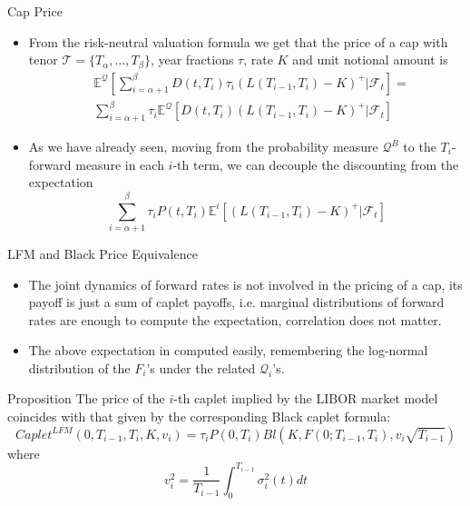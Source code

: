 \documentclass{beamer}
\begin{document}
\begin{frame}{Cap Price}
	\begin{itemize}
		\item From the risk-neutral valuation formula we get that the price of a cap with tenor $\mathcal{T} = \{T_\alpha,\ldots, T_\beta\}$, year fractions $\tau$, rate $K$ and unit notional amount is
		\begin{equation*}
			\begin{aligned}
			&\mathbb{E}^\mathcal{Q}\left[\sum_{i=\alpha+1}^{\beta}D(t,T_i)\tau_i(L(T_{i-1},T_i)-K)^+|\mathcal{F}_t\right]= \\
			&\sum_{i=\alpha+1}^{\beta}\tau_i\mathbb{E}^\mathcal{Q}[D(t,T_i)(L(T_{i-1},T_i)-K)^+|\mathcal{F}_t]
			\end{aligned}
		\end{equation*}
		\item As we have already seen, moving from the probability measure $\mathcal{Q}^B$ to the $T_i$-forward measure in each $i$-th term, we can decouple the discounting from the expectation
		\begin{equation*}
			\sum_{i=\alpha+1}^{\beta}\tau_iP(t,T_i)\mathbb{E}^i[(L(T_{i-1},T_i)-K)^+|\mathcal{F}_t]
		\end{equation*}
	\end{itemize}
\end{frame}

\begin{frame}{LFM and Black Price Equivalence}
	\begin{itemize}
		\item The joint dynamics of forward rates is not involved in the pricing of a cap, its payoff is just a sum of caplet payoffs, i.e. marginal distributions of forward rates are enough to compute the expectation, correlation does not matter. 
		\item The above expectation in computed easily, remembering the log-normal distribution of the $F_i$’s under the related $\mathcal{Q}_i$’s.
	\end{itemize}

	\begin{block}{Proposition}
		The price of the $i$-th caplet implied by the LIBOR market model coincides with that given by the corresponding Black caplet formula:
		\begin{equation}
			Caplet^{LFM}(0, T_{i-1}, T_i, K, v_i)= \tau_i P(0, T_i) Bl(K, F(0; T_{i-1}, T_i), v_i\sqrt{T_{i-1}})
		\end{equation}
		where
		\begin{equation}
		v_i^2 = \frac{1}{T_{i-1}}\int_0^{T_{i-1}}\sigma_i^2(t)dt
		\end{equation}
	\end{block}
\end{frame}
\end{document}
